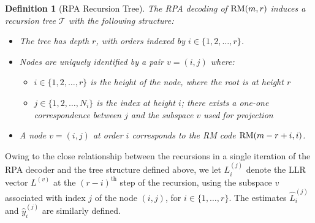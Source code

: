 \documentclass[conference,letterpaper]{IEEEtran}
\newtheorem{definition}{Definition}
\begin{document}
 \begin{definition}[RPA Recursion Tree]
The RPA decoding of $\text{\normalfont RM}(m, r)$ induces a recursion tree $\mathcal{T}$ with the following structure:
\begin{itemize}
    \item The tree has depth $r$, with orders indexed by $i \in \{1, 2, \ldots, r\}$.
    \item Nodes are uniquely identified by a pair $v = (i, j)$ where:
    \begin{itemize}
        \item $i \in \{1, 2, \ldots, r\}$ is the \emph{height} of the node, where the root is at height $r$
        \item $j \in \{1, 2, \ldots, N_i\}$ is the \emph{index} at height $i$; there exists a one-one correspondence between $j$ and the subspace $v$ used for projection
    \end{itemize}
    \item A node $v = (i, j)$ at order $i$ corresponds to the RM code $\text{\normalfont RM}(m - r + i, i)$.
\end{itemize}
\end{definition}
Owing to the close relationship between the recursions in a single iteration of the RPA decoder and the tree structure defined above, we let $L_i^{(j)}$ denote the LLR vector $L^{(v)}$ at the $(r-i)^\text{th}$ step of the recursion, using the subspace $v$ associated with index $j$ of the node $(i,j)$, for $i\in \{1,\ldots,r\}$. The estimates $\widehat{L}_i^{(j)}$ and $\widehat{y}_i^{(j)}$ are similarly defined.
\end{document}
